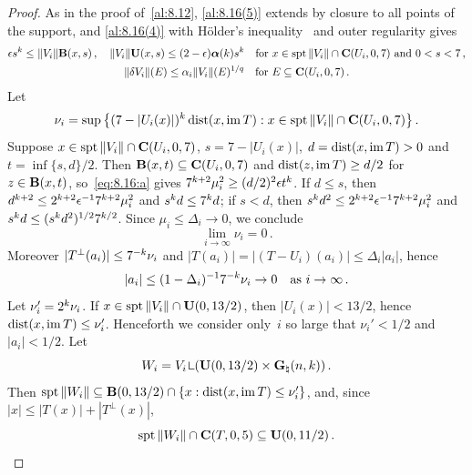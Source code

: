 \begin{proof}
    As in the proof of~\ref{al:8.12}, \ref{al:8.16(5)} extends by closure to all points of the
    support, and \ref{al:8.16(4)} with H\"older's inequality~\cite[2.4.14]{Federer1969} and outer
    regularity gives
    \begin{gather}
        \label{eq:8.16:a}
        \epsilon s^{k} \le \|V_i\| \mathbf{B}(x,s) \,, \quad \|V_i\| \mathbf{U}(x,s) \le (2 -
        \epsilon) \boldsymbol{\alpha}(k) s^{k} \quad \text{for $x \in \operatorname{spt} \|V_i\| \cap
        \mathbf{C} ( U_i, 0, 7 )$ and $0 < s < 7$} \,, \\
        \label{eq:8.16:b}
        \|\delta V_i\|(E) \le \alpha_i \|V_i\|(E)^{1/q} \quad \text{for $E \subseteq
        \mathbf{C} ( U_i, 0, 7 )$} \,.
    \end{gather}
    Let
    \begin{displaymath}
        \nu_i = \sup \big\{ (7 - |U_i(x)|)^{k} \operatorname{dist}(x, \operatorname{im} T) : x \in \operatorname{spt} \|V_i\| \cap
        \mathbf{C} ( U_i, 0, 7 ) \big\} \,.
    \end{displaymath}
    Suppose $x \in \operatorname{spt} \|V_i\| \cap \mathbf{C} ( U_i, 0, 7 )$, $s = 7 - |U_i(x)|$, $d = \operatorname{dist}(x, \operatorname{im} T) >
    0$ and $t = \inf \{ s, d \}/2$. Then $\mathbf{B}(x,t) \subseteq \mathbf{C} ( U_i, 0, 7 )$ and
    $\operatorname{dist}(z, \operatorname{im} T) \ge d/2$ for $z \in \mathbf{B}(x,t)$, so~\eqref{eq:8.16:a} gives $7^{k+2}
    \mu_i^2 \ge (d/2)^2 \epsilon t^{k}$. If $d \le s$, then $d^{k+2} \le 2^{k+2}
    \epsilon^{-1} 7^{k+2} \mu_i^2$ and $s^{k} d \le 7^{k} d$; if $s < d$, then
    $s^{k} d^2 \le 2^{k+2} \epsilon^{-1} 7^{k+2} \mu_i^2$ and $s^{k} d \le
    (s^{k} d^2)^{1/2} 7^{k/2}$. Since $\mu_i \le \Delta_i \to 0$, we conclude
    \begin{equation}
        \label{eq:8.16:23}
        \lim_{i \to \infty} \nu_i = 0 \,.
    \end{equation}
    Moreover $|T^\perp(a_i)| \le 7^{-k} \nu_i$ and $|T(a_i)| = |(T - U_i)(a_i)| \le \Delta_i
    |a_i|$, hence
    \begin{equation}
        \label{eq:8.16:22}
        |a_i| \le (1 - \Delta_i)^{-1} 7^{-k} \nu_i \to 0 \quad \text{as $i \to \infty$} \,.
    \end{equation}
    Let $\nu_i' = 2^{k} \nu_i$. If $x \in \operatorname{spt} \|V_i\| \cap \mathbf{U}(0,13/2)$, then $|U_i(x)| <
    13/2$, hence $\operatorname{dist}(x, \operatorname{im} T) \le \nu_i'$. Henceforth we consider only~$i$ so large that $\nu_i'
    < 1/2$ and $|a_i| < 1/2$. Let
    \begin{displaymath}
        W_i = V_i \restrict (\oball{0}{13/2} \times \pgrass{\adim}{\vdim}) \,.
    \end{displaymath}
    Then $\operatorname{spt} \|W_i\| \subseteq \mathbf{B}(0,13/2) \cap \{ x : \operatorname{dist}(x, \operatorname{im} T) \le \nu_i' \}$, and,
    since $|x| \le |T(x)| + |T^\perp(x)|$,
    \begin{equation}
        \label{eq:8.16:24}
        \operatorname{spt} \|W_i\| \cap \mathbf{C} ( T, 0, 5 ) \subseteq \mathbf{U}(0,11/2) \,.
    \end{equation}


\end{proof}
